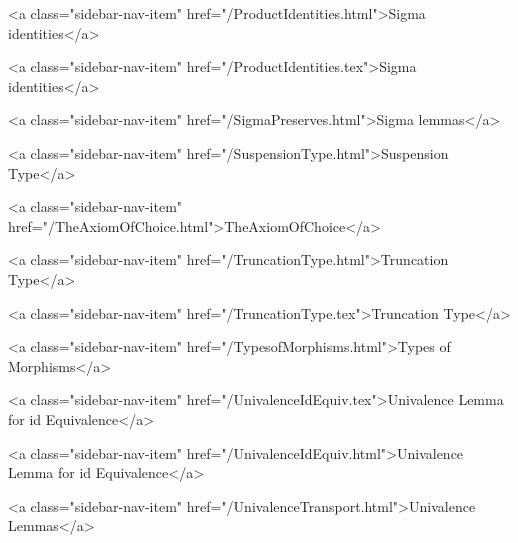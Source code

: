      
    
      
        
          <a class="sidebar-nav-item" href="/ProductIdentities.html">Sigma identities</a>
        
      
    
      
        
          <a class="sidebar-nav-item" href="/ProductIdentities.tex">Sigma identities</a>
        
      
    
      
        
          <a class="sidebar-nav-item" href="/SigmaPreserves.html">Sigma lemmas</a>
        
      
    
      
        
          <a class="sidebar-nav-item" href="/SuspensionType.html">Suspension Type</a>
        
      
    
      
        
          <a class="sidebar-nav-item" href="/TheAxiomOfChoice.html">TheAxiomOfChoice</a>
        
      
    
      
        
          <a class="sidebar-nav-item" href="/TruncationType.html">Truncation Type</a>
        
      
    
      
        
          <a class="sidebar-nav-item" href="/TruncationType.tex">Truncation Type</a>
        
      
    
      
        
          <a class="sidebar-nav-item" href="/TypesofMorphisms.html">Types of Morphisms</a>
        
      
    
      
        
          <a class="sidebar-nav-item" href="/UnivalenceIdEquiv.tex">Univalence Lemma for id Equivalence</a>
        
      
    
      
        
          <a class="sidebar-nav-item" href="/UnivalenceIdEquiv.html">Univalence Lemma for id Equivalence</a>
        
      
    
      
        
          <a class="sidebar-nav-item" href="/UnivalenceTransport.html">Univalence Lemmas</a>
        
